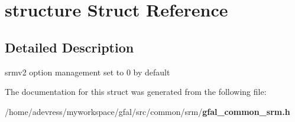 \section{structure Struct Reference}
\label{structstructure}


\subsection{Detailed Description}
srmv2 option management set to 0 by default 



The documentation for this struct was generated from the following file:\begin{CompactItemize}
\item 
/home/adevress/myworkspace/gfal/src/common/srm/\bf{gfal\_\-common\_\-srm.h}\end{CompactItemize}
